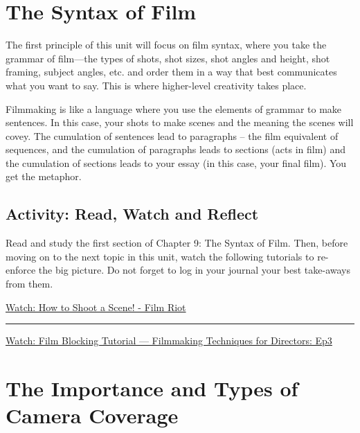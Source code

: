 \documentclass[
]{book}
\begin{document}
\hypertarget{the-syntax-of-film}{%
\section{The Syntax of Film}\label{the-syntax-of-film}}

The first principle of this unit will focus on film syntax, where you take the grammar of film---the types of shots, shot sizes, shot angles and height, shot framing, subject angles, etc. and order them in a way that best communicates what you want to say. This is where higher-level creativity takes place.

Filmmaking is like a language where you use the elements of grammar to make sentences. In this case, your shots to make scenes and the meaning the scenes will covey. The cumulation of sentences lead to paragraphs -- the film equivalent of sequences, and the cumulation of paragraphs leads to sections (acts in film) and the cumulation of sections leads to your essay (in this case, your final film). You get the metaphor.

\hypertarget{activity-read-watch-and-reflect}{%
\subsection*{Activity: Read, Watch and Reflect}\label{activity-read-watch-and-reflect}}

\begin{reflect}
Read and study the first section of Chapter 9: The Syntax of Film. Then, before moving on to the next topic in this unit, watch the following tutorials to re-enforce the big picture. Do not forget to log in your journal your best take-aways from them.

\href{https://www.youtube.com/watch?v=IK2IAEO-FUI}{Watch: How to Shoot a Scene! - Film Riot}

\begin{center}\rule{0.5\linewidth}{0.5pt}\end{center}

\href{https://www.youtube.com/watch?v=9AGaECt9j4g}{Watch: Film Blocking Tutorial --- Filmmaking Techniques for Directors: Ep3}
\end{reflect}

\hypertarget{the-importance-and-types-of-camera-coverage}{%
\section{The Importance and Types of Camera Coverage}\label{the-importance-and-types-of-camera-coverage}}
\end{document}
